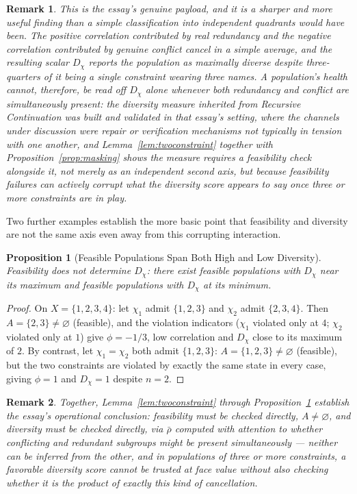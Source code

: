 \documentclass[11pt]{article}
\newtheorem{proposition}[definition]{Proposition}
\newtheorem*{remark}{Remark}
\begin{document}
\begin{remark}
This is the essay's genuine payload, and it is a sharper and more useful finding than a simple classification into independent quadrants would have been. The positive correlation contributed by real redundancy and the negative correlation contributed by genuine conflict cancel in a simple average, and the resulting scalar $D_\chi$ reports the population as maximally diverse despite three-quarters of it being a single constraint wearing three names. A population's health cannot, therefore, be read off $D_\chi$ alone whenever both redundancy and conflict are simultaneously present: the diversity measure inherited from \emph{Recursive Continuation} was built and validated in that essay's setting, where the channels under discussion were repair or verification mechanisms not typically in tension with one another, and Lemma~\ref{lem:twoconstraint} together with Proposition~\ref{prop:masking} shows the measure requires a feasibility check alongside it, not merely as an independent second axis, but because feasibility failures can actively corrupt what the diversity score appears to say once three or more constraints are in play.
\end{remark}

Two further examples establish the more basic point that feasibility and diversity are not the same axis even away from this corrupting interaction.

\begin{proposition}[Feasible Populations Span Both High and Low Diversity]
\label{prop:feasiblespan}
Feasibility does not determine $D_\chi$: there exist feasible populations with $D_\chi$ near its maximum and feasible populations with $D_\chi$ at its minimum.
\end{proposition}

\begin{proof}
On $X=\{1,2,3,4\}$: let $\chi_1$ admit $\{1,2,3\}$ and $\chi_2$ admit $\{2,3,4\}$. Then $A=\{2,3\}\neq\varnothing$ (feasible), and the violation indicators ($\chi_1$ violated only at $4$; $\chi_2$ violated only at $1$) give $\phi=-1/3$, low correlation and $D_\chi$ close to its maximum of $2$. By contrast, let $\chi_1=\chi_2$ both admit $\{1,2,3\}$: $A=\{1,2,3\}\neq\varnothing$ (feasible), but the two constraints are violated by exactly the same state in every case, giving $\phi=1$ and $D_\chi=1$ despite $n=2$.
\end{proof}

\begin{remark}
Together, Lemma~\ref{lem:twoconstraint} through Proposition~\ref{prop:feasiblespan} establish the essay's operational conclusion: feasibility must be checked directly, $A\neq\varnothing$, and diversity must be checked directly, via $\bar\rho$ computed with attention to whether conflicting and redundant subgroups might be present simultaneously — neither can be inferred from the other, and in populations of three or more constraints, a favorable diversity score cannot be trusted at face value without also checking whether it is the product of exactly this kind of cancellation.
\end{remark}
\end{document}
